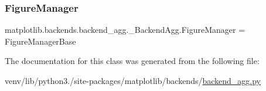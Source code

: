 \subsubsection{\texorpdfstring{Figure\+Manager}{FigureManager}}
{\footnotesize\ttfamily matplotlib.\+backends.\+backend\+\_\+agg.\+\_\+\+Backend\+Agg.\+Figure\+Manager = Figure\+Manager\+Base\hspace{0.3cm}{\ttfamily [static]}}



The documentation for this class was generated from the following file\+:\begin{DoxyCompactItemize}
\item 
venv/lib/python3./site-\/packages/matplotlib/backends/\hyperlink{backend__agg_8py}{backend\+\_\+agg.\+py}\end{DoxyCompactItemize}
